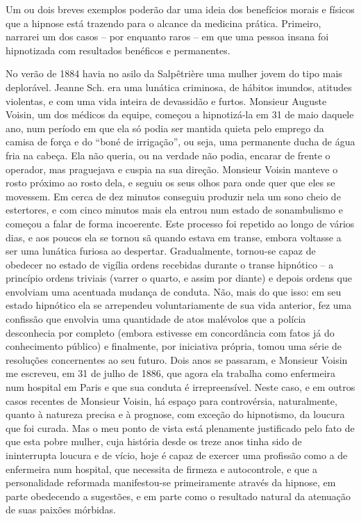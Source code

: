 Um ou dois breves exemplos poderão dar uma ideia dos benefícios morais e
físicos que a hipnose está trazendo para o alcance da medicina prática.
Primeiro, narrarei um dos casos -- por enquanto raros -- em que uma
pessoa insana foi hipnotizada com resultados benéficos e permanentes.

No verão de 1884 havia no asilo da Salpêtrière uma mulher jovem do tipo
mais deplorável.  Jeanne Sch. era uma lunática criminosa, de hábitos
imundos, atitudes violentas, e com uma vida inteira de devassidão e
furtos.  Monsieur Auguste Voisin, um dos médicos da equipe, começou a
hipnotizá-la em 31 de maio daquele ano, num período em que ela só podia
ser mantida quieta pelo emprego da camisa de força e do “boné de
irrigação”, ou seja, uma permanente ducha de água fria na cabeça. Ela
não queria, ou na verdade não podia, encarar de frente o operador, mas
praguejava e cuspia na sua direção. Monsieur Voisin manteve o rosto
próximo ao rosto dela, e seguiu os seus olhos para onde quer que eles
se movessem. Em cerca de dez minutos conseguiu produzir nela um sono
cheio de estertores, e com cinco minutos mais ela entrou num estado de
sonambulismo e começou a falar de forma incoerente.  Este processo foi
repetido ao longo de vários dias, e aos poucos ela se tornou sã quando
estava em transe, embora voltasse a ser uma lunática furiosa ao
despertar.  Gradualmente, tornou-se capaz de obedecer no estado de
vigília ordens recebidas durante o transe hipnótico -- a princípio
ordens triviais (varrer o quarto, e assim por diante) e depois ordens
que envolviam uma acentuada mudança de conduta.  Não, mais do que isso:
em seu estado hipnótico ela se arrependeu voluntariamente de sua vida
anterior, fez uma confissão que envolvia uma quantidade de atos
malévolos que a polícia desconhecia por completo (embora estivesse em
concordância com fatos já do conhecimento público) e finalmente, por
iniciativa própria, tomou uma série de resoluções concernentes ao seu
futuro.  Dois anos se passaram, e Monsieur Voisin me escreveu, em 31 de
julho de 1886, que agora ela trabalha como enfermeira num hospital em
Paris e que sua conduta é irrepreensível.  Neste caso, e em outros
casos recentes de Monsieur Voisin, há espaço para controvérsia,
naturalmente, quanto à natureza precisa e à prognose, com exceção do
hipnotismo, da loucura que foi curada.  Mas o meu ponto de vista está
plenamente justificado pelo fato de que esta pobre mulher, cuja
história desde os treze anos tinha sido de ininterrupta loucura e de
vício, hoje é capaz de exercer uma profissão como a de enfermeira num
hospital, que necessita de firmeza e autocontrole, e que a
personalidade reformada manifestou-se primeiramente através da hipnose,
em parte obedecendo a sugestões, e em parte como o resultado natural da
atenuação de suas paixões mórbidas.

